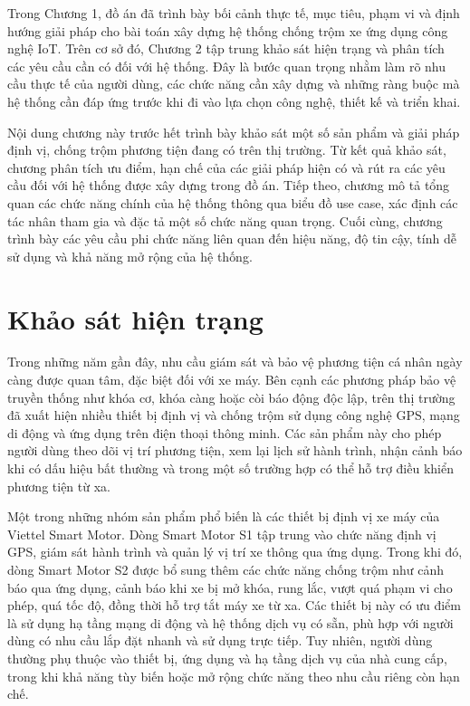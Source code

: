 \documentclass[../DoAn.tex]{subfiles}
\begin{document}
Trong Chương 1, đồ án đã trình bày bối cảnh thực tế, mục tiêu, phạm vi và định hướng giải pháp cho bài toán xây dựng hệ thống chống trộm xe ứng dụng công nghệ IoT. Trên cơ sở đó, Chương 2 tập trung khảo sát hiện trạng và phân tích các yêu cầu cần có đối với hệ thống. Đây là bước quan trọng nhằm làm rõ nhu cầu thực tế của người dùng, các chức năng cần xây dựng và những ràng buộc mà hệ thống cần đáp ứng trước khi đi vào lựa chọn công nghệ, thiết kế và triển khai.

Nội dung chương này trước hết trình bày khảo sát một số sản phẩm và giải pháp định vị, chống trộm phương tiện đang có trên thị trường. Từ kết quả khảo sát, chương phân tích ưu điểm, hạn chế của các giải pháp hiện có và rút ra các yêu cầu đối với hệ thống được xây dựng trong đồ án. Tiếp theo, chương mô tả tổng quan các chức năng chính của hệ thống thông qua biểu đồ use case, xác định các tác nhân tham gia và đặc tả một số chức năng quan trọng. Cuối cùng, chương trình bày các yêu cầu phi chức năng liên quan đến hiệu năng, độ tin cậy, tính dễ sử dụng và khả năng mở rộng của hệ thống.


\section{Khảo sát hiện trạng}
\label{section:2.1}
Trong những năm gần đây, nhu cầu giám sát và bảo vệ phương tiện cá nhân ngày càng được quan tâm, đặc biệt đối với xe máy. Bên cạnh các phương pháp bảo vệ truyền thống như khóa cơ, khóa càng hoặc còi báo động độc lập, trên thị trường đã xuất hiện nhiều thiết bị định vị và chống trộm sử dụng công nghệ GPS, mạng di động và ứng dụng trên điện thoại thông minh. Các sản phẩm này cho phép người dùng theo dõi vị trí phương tiện, xem lại lịch sử hành trình, nhận cảnh báo khi có dấu hiệu bất thường và trong một số trường hợp có thể hỗ trợ điều khiển phương tiện từ xa.

Một trong những nhóm sản phẩm phổ biến là các thiết bị định vị xe máy của Viettel Smart Motor. Dòng Smart Motor S1 tập trung vào chức năng định vị GPS, giám sát hành trình và quản lý vị trí xe thông qua ứng dụng. Trong khi đó, dòng Smart Motor S2 được bổ sung thêm các chức năng chống trộm như cảnh báo qua ứng dụng, cảnh báo khi xe bị mở khóa, rung lắc, vượt quá phạm vi cho phép, quá tốc độ, đồng thời hỗ trợ tắt máy xe từ xa. Các thiết bị này có ưu điểm là sử dụng hạ tầng mạng di động và hệ thống dịch vụ có sẵn, phù hợp với người dùng có nhu cầu lắp đặt nhanh và sử dụng trực tiếp. Tuy nhiên, người dùng thường phụ thuộc vào thiết bị, ứng dụng và hạ tầng dịch vụ của nhà cung cấp, trong khi khả năng tùy biến hoặc mở rộng chức năng theo nhu cầu riêng còn hạn chế.
\end{document}
